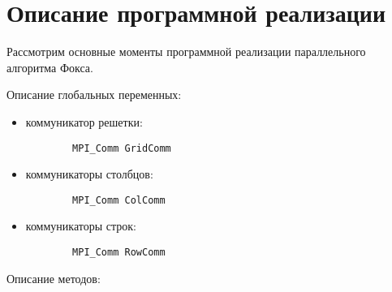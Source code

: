 \documentclass{report}
\begin{document}
\section*{Описание программной реализации}
Рассмотрим основные моменты программной реализации параллельного алгоритма Фокса.
\par Описание глобальных переменных:
\begin{itemize}
    \item коммуникатор решетки:
    \begin{lstlisting}
        MPI_Comm GridComm
    \end{lstlisting}
    \item коммуникаторы столбцов:
     \begin{lstlisting}
        MPI_Comm ColComm
    \end{lstlisting}
    \item коммуникаторы строк:
     \begin{lstlisting}
        MPI_Comm RowComm
    \end{lstlisting}
\end{itemize}
\par Описание методов:
\end{document}
